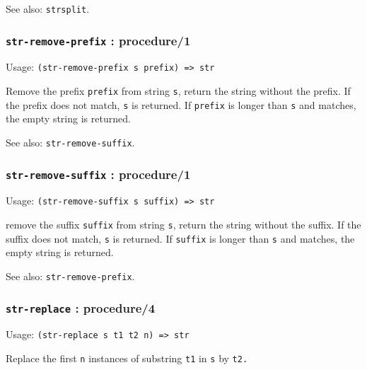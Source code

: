 \documentclass[
]{article}
\newcommand{\passthrough}[1]{#1}
\begin{document}
See also: \passthrough{\lstinline!strsplit!}.

\hypertarget{str-remove-prefix-procedure1}{%
\subsubsection{\texorpdfstring{\texttt{str-remove-prefix} :
procedure/1}{str-remove-prefix : procedure/1}}\label{str-remove-prefix-procedure1}}

Usage: \passthrough{\lstinline!(str-remove-prefix s prefix) => str!}

Remove the prefix \passthrough{\lstinline!prefix!} from string
\passthrough{\lstinline!s!}, return the string without the prefix. If
the prefix does not match, \passthrough{\lstinline!s!} is returned. If
\passthrough{\lstinline!prefix!} is longer than
\passthrough{\lstinline!s!} and matches, the empty string is returned.

See also: \passthrough{\lstinline!str-remove-suffix!}.

\hypertarget{str-remove-suffix-procedure1}{%
\subsubsection{\texorpdfstring{\texttt{str-remove-suffix} :
procedure/1}{str-remove-suffix : procedure/1}}\label{str-remove-suffix-procedure1}}

Usage: \passthrough{\lstinline!(str-remove-suffix s suffix) => str!}

remove the suffix \passthrough{\lstinline!suffix!} from string
\passthrough{\lstinline!s!}, return the string without the suffix. If
the suffix does not match, \passthrough{\lstinline!s!} is returned. If
\passthrough{\lstinline!suffix!} is longer than
\passthrough{\lstinline!s!} and matches, the empty string is returned.

See also: \passthrough{\lstinline!str-remove-prefix!}.

\hypertarget{str-replace-procedure4}{%
\subsubsection{\texorpdfstring{\texttt{str-replace} :
procedure/4}{str-replace : procedure/4}}\label{str-replace-procedure4}}

Usage: \passthrough{\lstinline!(str-replace s t1 t2 n) => str!}

Replace the first \passthrough{\lstinline!n!} instances of substring
\passthrough{\lstinline!t1!} in \passthrough{\lstinline!s!} by
\passthrough{\lstinline!t2.!}
\end{document}
